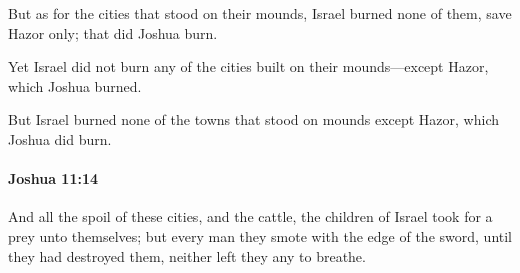 			\begin{versebox}
					\item[BHS] 
					\item[ASV] But as for the cities that stood on their mounds, Israel burned none of them, save Hazor only; that did Joshua burn.
					\item[NIV] Yet Israel did not burn any of the cities built on their mounds—except Hazor, which Joshua burned.
					\item[NRSV] But Israel burned none of the towns that stood on mounds except Hazor, which Joshua did burn.
			\end{versebox}

		\paragraph{Joshua 11:14} %
			\label{JOSHUA-11-14}

			And all the spoil of these cities, and the cattle, the children of Israel took for a prey unto themselves; but every man they smote with the edge of the sword, until they had destroyed them, neither left they any to breathe.

